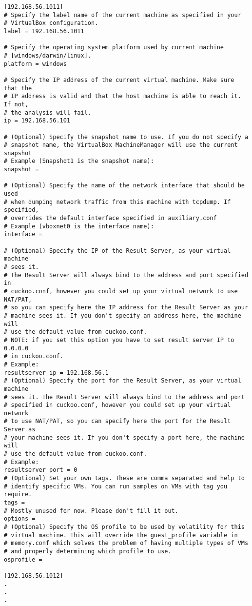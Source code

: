 \lstset{language=bash,breaklines=true, basicstyle=\footnotesize}
\begin{lstlisting}[frame=single, caption=Fichero ``virtualbox.conf'', breaklines=true]
[192.168.56.1011]
# Specify the label name of the current machine as specified in your
# VirtualBox configuration.
label = 192.168.56.1011

# Specify the operating system platform used by current machine
# [windows/darwin/linux].
platform = windows

# Specify the IP address of the current virtual machine. Make sure that the
# IP address is valid and that the host machine is able to reach it. If not,
# the analysis will fail.
ip = 192.168.56.101

# (Optional) Specify the snapshot name to use. If you do not specify a
# snapshot name, the VirtualBox MachineManager will use the current snapshot
# Example (Snapshot1 is the snapshot name):
snapshot = 

# (Optional) Specify the name of the network interface that should be used
# when dumping network traffic from this machine with tcpdump. If specified,
# overrides the default interface specified in auxiliary.conf
# Example (vboxnet0 is the interface name):
interface = 

# (Optional) Specify the IP of the Result Server, as your virtual machine 
# sees it.
# The Result Server will always bind to the address and port specified in
# cuckoo.conf, however you could set up your virtual network to use NAT/PAT,
# so you can specify here the IP address for the Result Server as your 
# machine sees it. If you don't specify an address here, the machine will 
# use the default value from cuckoo.conf.
# NOTE: if you set this option you have to set result server IP to 0.0.0.0 
# in cuckoo.conf.
# Example:
resultserver_ip = 192.168.56.1
# (Optional) Specify the port for the Result Server, as your virtual machine
# sees it. The Result Server will always bind to the address and port 
# specified in cuckoo.conf, however you could set up your virtual network 
# to use NAT/PAT, so you can specify here the port for the Result Server as 
# your machine sees it. If you don't specify a port here, the machine will 
# use the default value from cuckoo.conf.
# Example:
resultserver_port = 0
# (Optional) Set your own tags. These are comma separated and help to
# identify specific VMs. You can run samples on VMs with tag you require.
tags = 
# Mostly unused for now. Please don't fill it out.
options = 
# (Optional) Specify the OS profile to be used by volatility for this
# virtual machine. This will override the guest_profile variable in
# memory.conf which solves the problem of having multiple types of VMs
# and properly determining which profile to use.
osprofile = 

[192.168.56.1012]
.
.
. 
\end{lstlisting}

